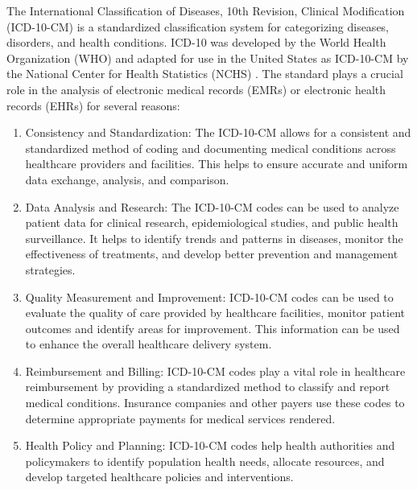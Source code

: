 \documentclass{bmcart}
\begin{document}
The International Classification of Diseases, 10th Revision, 
Clinical Modification (ICD-10-CM) \cite{icd10} is a 
standardized classification system 
for categorizing diseases, disorders, and health conditions. ICD-10 was 
developed by the World Health Organization (WHO) and adapted for use in the 
United States as ICD-10-CM by the National Center for Health 
Statistics (NCHS) \cite{icd10cm}. The standard plays a crucial role in 
the analysis of 
electronic medical records (EMRs) or electronic health records (EHRs) for 
several reasons:
\begin{enumerate}
\item{Consistency and Standardization: The ICD-10-CM allows for a consistent 
and standardized method of coding and documenting medical conditions across 
healthcare providers and facilities. This helps to ensure accurate and 
uniform data exchange, analysis, and comparison.}
\item{Data Analysis and Research: The ICD-10-CM codes can be used to analyze 
patient data for clinical research, epidemiological studies, and public health 
surveillance. It helps to identify trends and patterns in diseases, monitor 
the effectiveness of treatments, and develop better prevention and management 
strategies.}
\item{Quality Measurement and Improvement: ICD-10-CM codes can be used to 
evaluate the quality of care provided by healthcare facilities, monitor 
patient outcomes and identify areas for improvement. This information can 
be used to enhance the overall healthcare delivery system.}
\item{Reimbursement and Billing: ICD-10-CM codes play a vital role in 
healthcare reimbursement by providing a standardized method to classify and 
report medical conditions. Insurance companies and other payers use these 
codes to determine appropriate payments for medical services rendered.}
\item{Health Policy and Planning: ICD-10-CM codes help health authorities and 
policymakers to identify population health needs, allocate resources, and 
develop targeted healthcare policies and interventions.}
\end{enumerate}
\end{document}
